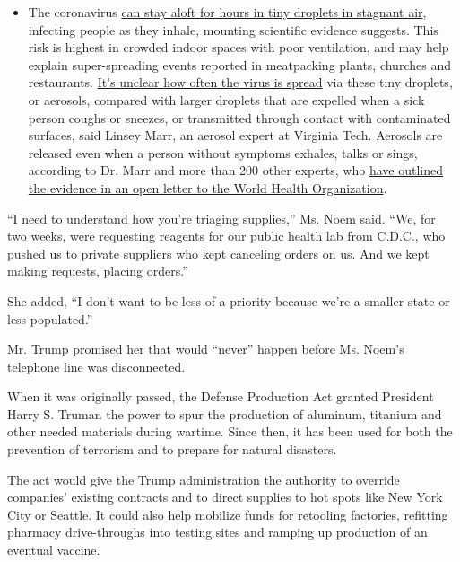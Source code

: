 \begin{itemize}
  \begin{itemize}
  \tightlist
  \item
    The coronavirus
    \href{https://www.nytimes3xbfgragh.onion/2020/07/04/health/239-experts-with-one-big-claim-the-coronavirus-is-airborne.html?action=click\&pgtype=Article\&state=default\&region=MAIN_CONTENT_3\&context=storylines_faq}{can
    stay aloft for hours in tiny droplets in stagnant air}, infecting
    people as they inhale, mounting scientific evidence suggests. This
    risk is highest in crowded indoor spaces with poor ventilation, and
    may help explain super-spreading events reported in meatpacking
    plants, churches and restaurants.
    \href{https://www.nytimes3xbfgragh.onion/2020/07/06/health/coronavirus-airborne-aerosols.html?action=click\&pgtype=Article\&state=default\&region=MAIN_CONTENT_3\&context=storylines_faq}{It's
    unclear how often the virus is spread} via these tiny droplets, or
    aerosols, compared with larger droplets that are expelled when a
    sick person coughs or sneezes, or transmitted through contact with
    contaminated surfaces, said Linsey Marr, an aerosol expert at
    Virginia Tech. Aerosols are released even when a person without
    symptoms exhales, talks or sings, according to Dr. Marr and more
    than 200 other experts, who
    \href{https://academic.oup.com/cid/article/doi/10.1093/cid/ciaa939/5867798}{have
    outlined the evidence in an open letter to the World Health
    Organization}.
  \end{itemize}
\end{itemize}

``I need to understand how you're triaging supplies,'' Ms. Noem said.
``We, for two weeks, were requesting reagents for our public health lab
from C.D.C., who pushed us to private suppliers who kept canceling
orders on us. And we kept making requests, placing orders.''

She added, ``I don't want to be less of a priority because we're a
smaller state or less populated.''

Mr. Trump promised her that would ``never'' happen before Ms. Noem's
telephone line was disconnected.

When it was originally passed, the Defense Production Act granted
President Harry S. Truman the power to spur the production of aluminum,
titanium and other needed materials during wartime. Since then, it has
been used for both the prevention of terrorism and to prepare for
natural disasters.

The act would give the Trump administration the authority to override
companies' existing contracts and to direct supplies to hot spots like
New York City or Seattle. It could also help mobilize funds for
retooling factories, refitting pharmacy drive-throughs into testing
sites and ramping up production of an eventual vaccine.

